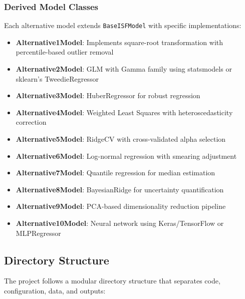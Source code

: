 \subsubsection{Derived Model Classes}

Each alternative model extends \texttt{BaseISFModel} with specific implementations:

\begin{itemize}
    \item \textbf{Alternative1Model}: Implements square-root transformation with percentile-based outlier removal
    \item \textbf{Alternative2Model}: GLM with Gamma family using statsmodels or sklearn's TweedieRegressor
    \item \textbf{Alternative3Model}: HuberRegressor for robust regression
    \item \textbf{Alternative4Model}: Weighted Least Squares with heteroscedasticity correction
    \item \textbf{Alternative5Model}: RidgeCV with cross-validated alpha selection
    \item \textbf{Alternative6Model}: Log-normal regression with smearing adjustment
    \item \textbf{Alternative7Model}: Quantile regression for median estimation
    \item \textbf{Alternative8Model}: BayesianRidge for uncertainty quantification
    \item \textbf{Alternative9Model}: PCA-based dimensionality reduction pipeline
    \item \textbf{Alternative10Model}: Neural network using Keras/TensorFlow or MLPRegressor
\end{itemize}

\subsection{Directory Structure}

The project follows a modular directory structure that separates code, configuration, data, and outputs:

